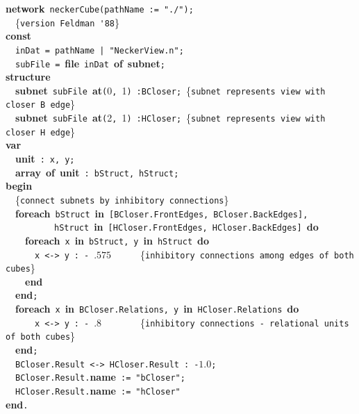 {\bf network}~\verb&neckerCube&\verb&(&\verb&pathName&~\verb&:=&~\verb&"./"&\verb&)&\verb&;&\\
~~{\footnotesize \{\verb{version Feldman '88{\}}\\
{\bf const}\\
~~\verb&inDat&~\verb&=&~\verb&pathName&~\verb&|&~\verb&"NeckerView.n"&\verb&;&\\
~~\verb&subFile&~\verb&=&~{\bf file}~\verb&inDat&~{\bf of}~{\bf subnet}\verb&;&\\
{\bf structure}\\
~~{\bf subnet}~\verb&subFile&~{\bf at}\verb&(&0\verb&,&~1\verb&)&~\verb&:&\verb&BCloser&\verb&;&~{\footnotesize \{\verb{subnet represents view with closer B edge{\}}\\
~~{\bf subnet}~\verb&subFile&~{\bf at}\verb&(&2\verb&,&~1\verb&)&~\verb&:&\verb&HCloser&\verb&;&~{\footnotesize \{\verb{subnet represents view with closer H edge{\}}\\
{\bf var}\\
~~{\bf unit}~\verb&:&~\verb&x&\verb&,&~\verb&y&\verb&;&\\
~~{\bf array}~{\bf of}~{\bf unit}~\verb&:&~\verb&bStruct&\verb&,&~\verb&hStruct&\verb&;&\\
{\bf begin}\\
~~{\footnotesize \{\verb{connect subnets by inhibitory connections{\}}\\
~~{\bf foreach}~\verb&bStruct&~{\bf in}~\verb&[&\verb&BCloser&\verb&.&\verb&FrontEdges&\verb&,&~\verb&BCloser&\verb&.&\verb&BackEdges&\verb&]&\verb&,&\\
~~~~~~~~~~\verb&hStruct&~{\bf in}~\verb&[&\verb&HCloser&\verb&.&\verb&FrontEdges&\verb&,&~\verb&HCloser&\verb&.&\verb&BackEdges&\verb&]&~{\bf do}\\
~~~~{\bf foreach}~\verb&x&~{\bf in}~\verb&bStruct&\verb&,&~\verb&y&~{\bf in}~\verb&hStruct&~{\bf do}\\
~~~~~~\verb&x&~\verb&<->&~\verb&y&~\verb&:&~\verb&-&~$.575$~~~~~~{\footnotesize \{\verb{inhibitory connections among edges of both cubes{\}}\\
~~~~{\bf end}\\
~~{\bf end}\verb&;&\\
~~{\bf foreach}~\verb&x&~{\bf in}~\verb&BCloser&\verb&.&\verb&Relations&\verb&,&~\verb&y&~{\bf in}~\verb&HCloser&\verb&.&\verb&Relations&~{\bf do}\\
~~~~~~\verb&x&~\verb&<->&~\verb&y&~\verb&:&~\verb&-&~$.8$~~~~~~~~{\footnotesize \{\verb{inhibitory connections - relational units of both cubes{\}}\\
~~{\bf end}\verb&;&\\
~~\verb&BCloser&\verb&.&\verb&Result&~\verb&<->&~\verb&HCloser&\verb&.&\verb&Result&~\verb&:&~\verb&-&$1.0$\verb&;&\\
~~\verb&BCloser&\verb&.&\verb&Result&\verb&.&{\bf name}~\verb&:=&~\verb&"bCloser"&\verb&;&\\
~~\verb&HCloser&\verb&.&\verb&Result&\verb&.&{\bf name}~\verb&:=&~\verb&"hCloser"&\\
{\bf end}\verb&.&\\[.5 cm]

